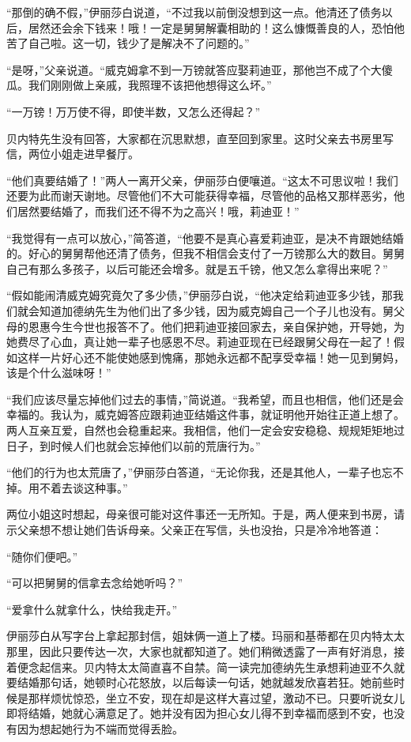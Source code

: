 \par “那倒的确不假，”伊丽莎白说道，“不过我以前倒没想到这一点。他清还了债务以后，居然还会余下钱来！哦！一定是舅舅解囊相助的！这么慷慨善良的人，恐怕他苦了自己啦。这一切，钱少了是解决不了问题的。”
\par “是呀，”父亲说道。“威克姆拿不到一万镑就答应娶莉迪亚，那他岂不成了个大傻瓜。我们刚刚做上亲戚，我照理不该把他想得这么坏。”
\par “一万镑！万万使不得，即使半数，又怎么还得起？”
\par 贝内特先生没有回答，大家都在沉思默想，直至回到家里。这时父亲去书房里写信，两位小姐走进早餐厅。
\par “他们真要结婚了！”两人一离开父亲，伊丽莎白便嚷道。“这太不可思议啦！我们还要为此而谢天谢地。尽管他们不大可能获得幸福，尽管他的品格又那样恶劣，他们居然要结婚了，而我们还不得不为之高兴！哦，莉迪亚！”
\par “我觉得有一点可以放心，”简答道，“他要不是真心喜爱莉迪亚，是决不肯跟她结婚的。好心的舅舅帮他还清了债务，但我不相信会支付了一万镑那么大的数目。舅舅自己有那么多孩子，以后可能还会增多。就是五千镑，他又怎么拿得出来呢？”
\par “假如能闹清威克姆究竟欠了多少债，”伊丽莎白说，“他决定给莉迪亚多少钱，那我们就会知道加德纳先生为他们出了多少钱，因为威克姆自己一个子儿也没有。舅父母的恩惠今生今世也报答不了。他们把莉迪亚接回家去，亲自保护她，开导她，为她费尽了心血，真让她一辈子也感恩不尽。莉迪亚现在已经跟舅父母在一起了！假如这样一片好心还不能使她感到愧痛，那她永远都不配享受幸福！她一见到舅妈，该是个什么滋味呀！”
\par “我们应该尽量忘掉他们过去的事情，”简说道。“我希望，而且也相信，他们还是会幸福的。我认为，威克姆答应跟莉迪亚结婚这件事，就证明他开始往正道上想了。两人互亲互爱，自然也会稳重起来。我相信，他们一定会安安稳稳、规规矩矩地过日子，到时候人们也就会忘掉他们以前的荒唐行为。”
\par “他们的行为也太荒唐了，”伊丽莎白答道，“无论你我，还是其他人，一辈子也忘不掉。用不着去谈这种事。”
\par 两位小姐这时想起，母亲很可能对这件事还一无所知。于是，两人便来到书房，请示父亲想不想让她们告诉母亲。父亲正在写信，头也没抬，只是冷冷地答道：
\par “随你们便吧。”
\par “可以把舅舅的信拿去念给她听吗？”
\par “爱拿什么就拿什么，快给我走开。”
\par 伊丽莎白从写字台上拿起那封信，姐妹俩一道上了楼。玛丽和基蒂都在贝内特太太那里，因此只要传达一次，大家也就都知道了。她们稍微透露了一声有好消息，接着便念起信来。贝内特太太简直喜不自禁。简一读完加德纳先生承想莉迪亚不久就要结婚那句话，她顿时心花怒放，以后每读一句话，她就越发欣喜若狂。她前些时候是那样烦忧惊恐，坐立不安，现在却是这样大喜过望，激动不已。只要听说女儿即将结婚，她就心满意足了。她并没有因为担心女儿得不到幸福而感到不安，也没有因为想起她行为不端而觉得丢脸。
